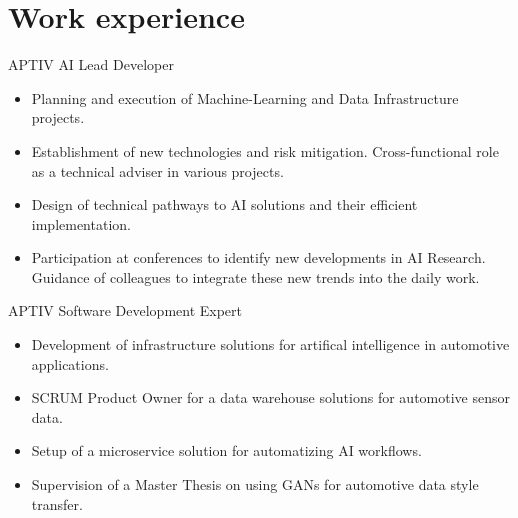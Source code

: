 \documentclass[singlesided,
               paper=a4,
               fontsize=10pt
              ]{my-resume}
\begin{document}
\section[\faBriefcase]{Work experience}
    {APTIV}
    {AI Lead Developer}
    {\begin{itemize}
        \item Planning and execution of Machine-Learning and Data Infrastructure projects. 
        \item Establishment of new technologies and risk mitigation. Cross-functional role as a technical adviser in various projects. 
        \item Design of technical pathways to AI solutions and their efficient implementation.
        \item Participation at conferences to identify new developments in AI Research. Guidance of colleagues to integrate these new trends into the daily work.
    \end{itemize}}
    {APTIV}
    {Software Development Expert}
    {\begin{itemize}
        \item Development of infrastructure solutions for artifical intelligence in automotive applications. 
        \item SCRUM Product Owner for a data warehouse solutions for automotive sensor data. 
        \item Setup of a microservice solution for automatizing AI workflows.
        \item Supervision of a Master Thesis on using GANs for automotive data style transfer.
    \end{itemize}}
\end{document}
